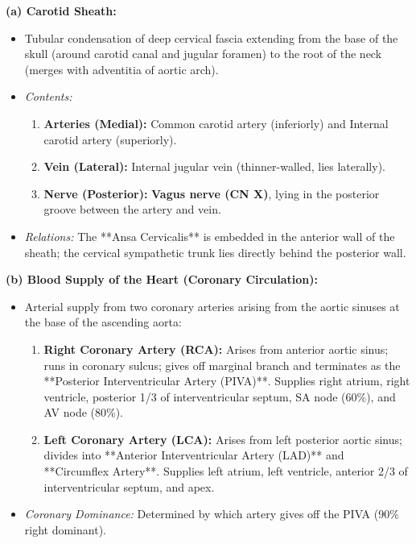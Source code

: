 \documentclass[11pt,a4paper]{article}
\begin{document}
\begin{ansbox}
\textbf{(a) Carotid Sheath:}
\begin{itemize}[leftmargin=*]
    \item Tubular condensation of deep cervical fascia extending from the base of the skull (around carotid canal and jugular foramen) to the root of the neck (merges with adventitia of aortic arch).
    \item \textit{Contents:}
    \begin{enumerate}
        \item \textbf{Arteries (Medial):} Common carotid artery (inferiorly) and Internal carotid artery (superiorly).
        \item \textbf{Vein (Lateral):} Internal jugular vein (thinner-walled, lies laterally).
        \item \textbf{Nerve (Posterior):} \textbf{Vagus nerve (CN X)}, lying in the posterior groove between the artery and vein.
    \end{enumerate}
    \item \textit{Relations:} The **Ansa Cervicalis** is embedded in the anterior wall of the sheath; the cervical sympathetic trunk lies directly behind the posterior wall.
\end{itemize}

\textbf{(b) Blood Supply of the Heart (Coronary Circulation):}
\begin{itemize}[leftmargin=*]
    \item Arterial supply from two coronary arteries arising from the aortic sinuses at the base of the ascending aorta:
    \begin{enumerate}
        \item \textbf{Right Coronary Artery (RCA):} Arises from anterior aortic sinus; runs in coronary sulcus; gives off marginal branch and terminates as the **Posterior Interventricular Artery (PIVA)**. Supplies right atrium, right ventricle, posterior 1/3 of interventricular septum, SA node (60\%), and AV node (80\%).
        \item \textbf{Left Coronary Artery (LCA):} Arises from left posterior aortic sinus; divides into **Anterior Interventricular Artery (LAD)** and **Circumflex Artery**. Supplies left atrium, left ventricle, anterior 2/3 of interventricular septum, and apex.
    \end{enumerate}
    \item \textit{Coronary Dominance:} Determined by which artery gives off the PIVA (90\% right dominant).
\end{itemize}


\end{ansbox}
\end{document}
